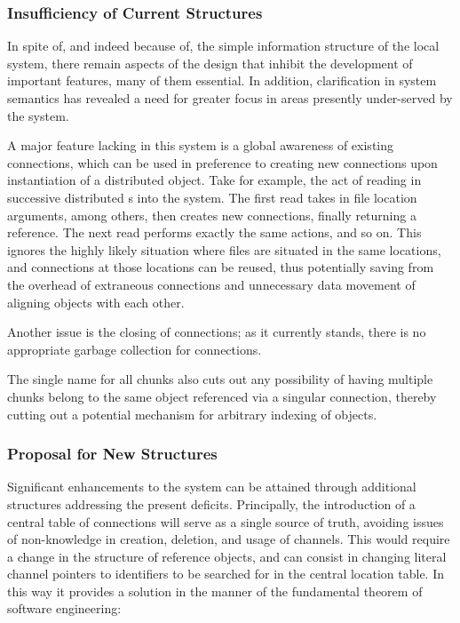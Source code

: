 \subsubsection{Insufficiency of Current Structures}\label{insufficiency-of-current-structures}

In spite of, and indeed because of, the simple information structure of the local system, there remain aspects of the design that inhibit the development of important features, many of them essential.
In addition, clarification in system semantics has revealed a need for greater focus in areas presently under-served by the system.

A major feature lacking in this system is a global awareness of existing connections, which can be used in preference to creating new connections upon instantiation of a distributed object.
Take for example, the act of reading in successive distributed s into the system.
The first read takes in file location arguments, among others, then creates new connections, finally returning a reference.
The next read performs exactly the same actions, and so on.
This ignores the highly likely situation where files are situated in the same locations, and connections at those locations can be reused, thus potentially saving from the overhead of extraneous connections and unnecessary data movement of aligning objects with each other.

Another issue is the closing of connections; as it currently stands, there is no appropriate garbage collection for connections.

The single name for all chunks also cuts out any possibility of having multiple chunks belong to the same object referenced via a singular connection, thereby cutting out a potential mechanism for arbitrary indexing of objects.

\subsubsection{Proposal for New Structures}\label{sec:localproposal}

Significant enhancements to the system can be attained through additional structures addressing the present deficits.
Principally, the introduction of a central table of connections will serve as a single source of truth, avoiding issues of non-knowledge in creation, deletion, and usage of channels.
This would require a change in the structure of reference objects, and can consist in changing literal  channel pointers to identifiers to be searched for in the central location table.
In this way it provides a solution in the manner of the fundamental theorem of software engineering:

